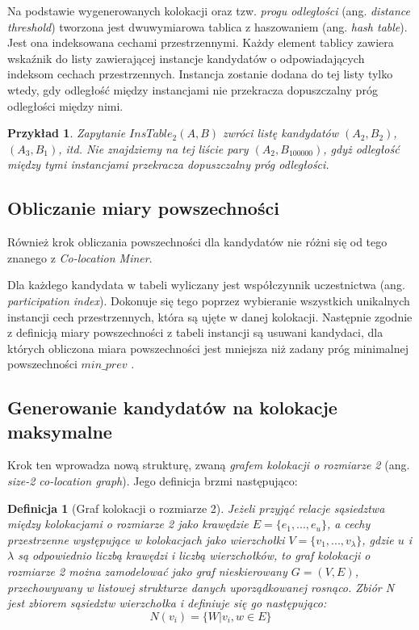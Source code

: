 \documentclass[12pt]{article}
\newtheorem{defin}{Definicja}
\newtheorem{sample}{Przykład}
\begin{document}
Na podstawie wygenerowanych kolokacji oraz tzw. \textit{progu odległości} (ang. \textit{distance threshold}) tworzona jest dwuwymiarowa tablica z haszowaniem (ang. \textit{hash table}). Jest ona indeksowana cechami przestrzennymi. Każdy element tablicy zawiera wskaźnik do listy zawierającej instancje kandydatów o odpowiadających indeksom cechach przestrzennych. Instancja zostanie dodana do tej listy tylko wtedy, gdy odległość między instancjami nie przekracza dopuszczalny próg odległości między nimi.

\begin{sample}
Zapytanie $InsTable_{2}(A,B)$ zwróci listę kandydatów $(A_{2}, B_{2})$, $(A_{3}, B_{1})$, itd. Nie znajdziemy na tej liście pary $(A_{2}, B_{100000})$, gdyż odległość między tymi instancjami przekracza dopuszczalny próg odległości.
\end{sample}

\subsection{Obliczanie miary powszechności}

Również krok obliczania powszechności dla kandydatów nie różni się od tego znanego z \textit{Co-location Miner}.

Dla każdego kandydata w tabeli wyliczany jest współczynnik uczestnictwa (ang. \textit{participation index}). Dokonuje się tego poprzez wybieranie wszystkich unikalnych instancji cech przestrzennych, która są ujęte w danej kolokacji. Następnie zgodnie z definicją miary powszechności z tabeli instancji są usuwani kandydaci, dla których obliczona miara powszechności jest mniejsza niż zadany próg minimalnej powszechności $ min\_prev $ \cite{huang}. 

\subsection{Generowanie kandydatów na kolokacje maksymalne}

Krok ten wprowadza nową strukturę, zwaną \textit{grafem kolokacji o rozmiarze 2} (ang. \textit{size-2 co-location graph}). Jego definicja brzmi następująco:

\begin{defin}[Graf kolokacji o rozmiarze 2]
Jeżeli przyjąć relacje sąsiedztwa między kolokacjami o rozmiarze 2 jako krawędzie $ E = \{e_{1},...,e_{u}\}$, a cechy przestrzenne występujące w kolokacjach jako wierzchołki $ V = \{v_{1},...,v_{\lambda}\}$, gdzie $ u $ i $ \lambda $ są odpowiednio liczbą krawędzi i liczbą wierzchołków, to graf kolokacji o rozmiarze 2 można zamodelować jako graf nieskierowany $ G= (V, E)$, przechowywany w listowej strukturze danych uporządkowanej rosnąco. Zbiór N jest zbiorem sąsiedztw wierzchołka i definiuje się go następująco:
\begin{equation}
N(v_{i}) = \{W|{v_{i},w} \in E\}
\end{equation}
\end{defin}
\end{document}
